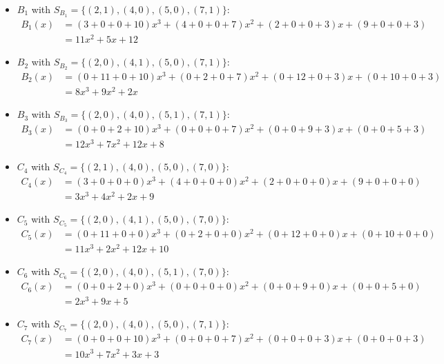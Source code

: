 \begin{enumerate}
\begin{itemize}
        \item $B_1$ with $S_{B_1}=\{(2,1), (4,0), (5,0), (7,1)\}$:
        {\setlength{\mathindent}{2pt}
        \begin{align*}
            B_1(x) &=(3+0+0+10)x^3 + (4+0+0+7)x^2 + (2+0+0+3)x + (9+0+0+3)\\
            &=11x^2 + 5x + 12
        \end{align*}
        }
        \item $B_2$ with $S_{B_2}=\{(2,0), (4,1), (5,0), (7,1)\}$:
        {\setlength{\mathindent}{2pt}
        \begin{align*}
            B_2(x) &=(0+11+0+10)x^3 + (0+2+0+7)x^2 + (0+12+0+3)x + (0+10+0+3)\\
            &=8x^3 + 9x^2 + 2x
        \end{align*}
        }
        \item $B_3$ with $S_{B_3}=\{(2,0), (4,0), (5,1), (7,1)\}$:
        {\setlength{\mathindent}{2pt}
        \begin{align*}
            B_3(x) &=(0+0+2+10)x^3 + (0+0+0+7)x^2 + (0+0+9+3)x + (0+0+5+3)\\
            &=12x^3 + 7x^2 + 12x + 8
        \end{align*}
        }

        \item $C_4$ with $S_{C_4}=\{(2,1), (4,0), (5,0), (7,0)\}$:
        {\setlength{\mathindent}{2pt}
        \begin{align*}
            C_4(x) &=(3+0+0+0)x^3 + (4+0+0+0)x^2 + (2+0+0+0)x + (9+0+0+0)\\
            &=3x^3 + 4x^2 + 2x + 9
        \end{align*}
        }
        \item $C_5$ with $S_{C_5}=\{(2,0), (4,1), (5,0), (7,0)\}$:
        {\setlength{\mathindent}{2pt}
        \begin{align*}
            C_5(x) &=(0+11+0+0)x^3 + (0+2+0+0)x^2 + (0+12+0+0)x + (0+10+0+0)\\
            &=11x^3 + 2x^2 + 12x + 10
        \end{align*}
        }
        \item $C_6$ with $S_{C_6}=\{(2,0), (4,0), (5,1), (7,0)\}$:
        {\setlength{\mathindent}{2pt}
        \begin{align*}
            C_6(x) &=(0+0+2+0)x^3 + (0+0+0+0)x^2 + (0+0+9+0)x + (0+0+5+0)\\
            &=2x^3 + 9x + 5
        \end{align*}
        }
        \item $C_7$ with $S_{C_7}=\{(2,0), (4,0), (5,0), (7,1)\}$:
        {\setlength{\mathindent}{2pt}
        \begin{align*}
            C_7(x) &=(0+0+0+10)x^3 + (0+0+0+7)x^2 + (0+0+0+3)x + (0+0+0+3)\\
            &=10x^3 + 7x^2 + 3x + 3
        \end{align*}
        }
    \end{itemize}
\end{enumerate}

